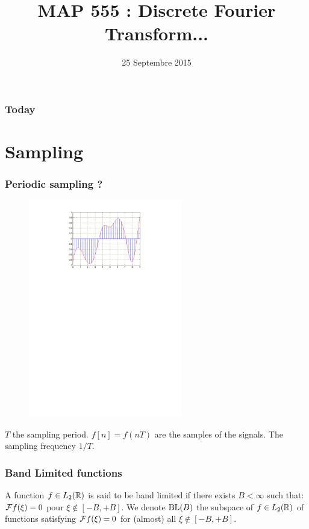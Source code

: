 

\title{MAP 555 : Discrete Fourier Transform...}

\date{25 Septembre 2015}
\maketitle



\begin{frame}
\frametitle{Today}
\tableofcontents
\end{frame}

\section{Sampling}
\begin{frame}
\frametitle{Periodic sampling ?}
\begin{figure}
  \centering
  \includegraphics[width=0.6\textwidth]{sampling}\\
\end{figure}
\alert{$T$} the \alert{sampling period}. \alert{$f[n]= f(nT)$} are the samples of the signals.
The \alert{sampling frequency} \alert{$1/T$}.
\end{frame}


\begin{frame}
\frametitle{Band Limited functions}
\begin{definition}
A function $f \in L_2(\mathbb{R})$ is said to be  \alert{band limited} if there exists $B < \infty$ such that: $\mathcal{F} f(\xi) = 0$ pour $\xi \not \in [-B,+B]$. We denote $\mathrm{BL}(B)$ the subspace of $f \in L_2(\mathbb{R})$ of functions satisfying $\mathcal{F} f(\xi) = 0$ for (almost) all $\xi \not \in [-B,+B]$.
\end{definition}
\end{frame}

